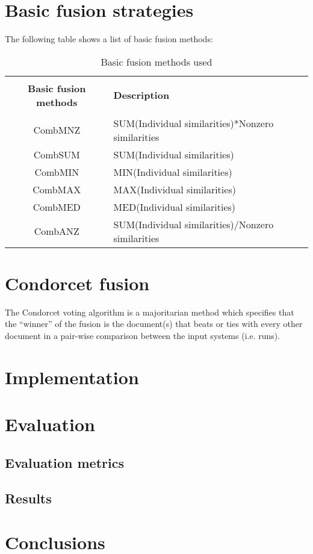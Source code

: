     \section{Basic fusion strategies}

    The following table shows a list of basic fusion methods:

    \begin{table}[H]
        \centering
        \begin{tabular}{|c|p{4cm}|}
        \hline \\
        \textbf{Basic fusion methods} & \textbf{Description} \\
        \hline \\
        CombMNZ & SUM(Individual similarities)*Nonzero similarities \\
        \hline
        CombSUM & SUM(Individual similarities) \\
        \hline
        CombMIN & MIN(Individual similarities) \\
        \hline
        CombMAX & MAX(Individual similarities) \\
        \hline
        CombMED & MED(Individual similarities) \\
        \hline
        CombANZ & SUM(Individual similarities)/Nonzero similarities \\
        \hline
        \end{tabular}
        \caption{Basic fusion methods used}
    \end{table}
    
    \section{Condorcet fusion}

    The Condorcet voting algorithm is a majoritarian method which specifies
    that the ``winner'' of the fusion is the document(s) that beats or ties
    with every other document in a pair-wise comparison between the input
    systems (i.e. runs).

    \section{Implementation}
    \section{Evaluation}
    		  
        \subsection{Evaluation metrics}
			
	    \subsection{Results}

	\section{Conclusions}
	


